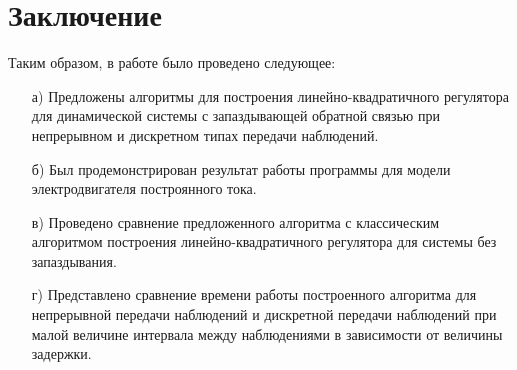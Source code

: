 \section{Заключение}

Таким образом, в работе было проведено следующее:
\begin{itemize} 
        \item[а)] Предложены алгоритмы для построения линейно-квадратичного регулятора для динамической системы с запаздывающей обратной связью при непрерывном и дискретном типах передачи наблюдений.

        \item[б)] Был продемонстрирован результат работы программы для модели электродвигателя построянного тока.

        \item[в)] Проведено сравнение предложенного алгоритма с классическим алгоритмом построения линейно-квадратичного регулятора для системы без запаздывания.

        \item[г)] Представлено сравнение времени работы построенного алгоритма для непрерывной передачи наблюдений и дискретной передачи наблюдений при малой величине интервала между наблюдениями в зависимости от величины задержки.
\end{itemize} 

